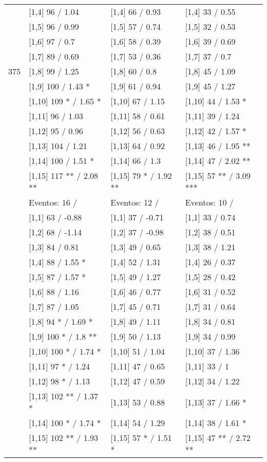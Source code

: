 \begin{table}
\begin{tabular}[t]{llll}
\addlinespace
 & {}[1,4] 96  / 1.04 & {}[1,4] 66  / 0.93 & {}[1,4] 33  / 0.55\\
 & {}[1,5] 96  / 0.99 & {}[1,5] 57  / 0.74 & {}[1,5] 32  / 0.53\\
 & {}[1,6] 97  / 0.7 & {}[1,6] 58  / 0.39 & {}[1,6] 39  / 0.69\\
 & {}[1,7] 89  / 0.69 & {}[1,7] 53  / 0.36 & {}[1,7] 37  / 0.7\\
375 & {}[1,8] 99  / 1.25 & {}[1,8] 60  / 0.8 & {}[1,8] 45  / 1.09\\
\addlinespace
 & {}[1,9] 100  / 1.43 * & {}[1,9] 61  / 0.94 & {}[1,9] 45  / 1.27\\
 & {}[1,10] 109 * / 1.65 * & {}[1,10] 67  / 1.15 & {}[1,10] 44  / 1.53 *\\
 & {}[1,11] 96  / 1.03 & {}[1,11] 58  / 0.61 & {}[1,11] 39  / 1.24\\
 & {}[1,12] 95  / 0.96 & {}[1,12] 56  / 0.63 & {}[1,12] 42  / 1.57 *\\
 & {}[1,13] 104  / 1.21 & {}[1,13] 64  / 0.92 & {}[1,13] 46  / 1.95 **\\
\addlinespace
 & {}[1,14] 100  / 1.51 * & {}[1,14] 66  / 1.3 & {}[1,14] 47  / 2.02 **\\
 & {}[1,15] 117 ** / 2.08 ** & {}[1,15] 79 * / 1.92 ** & {}[1,15] 57 ** / 3.09 ***\\
 & Eventos:  16 / & Eventos:  12 / & Eventos:  10 /\\
 & {}[1,1] 63  / -0.88 & {}[1,1] 37  / -0.71 & {}[1,1] 33  / 0.74\\
 & {}[1,2] 68  / -1.14 & {}[1,2] 37  / -0.98 & {}[1,2] 38  / 0.51\\
\addlinespace
 & {}[1,3] 84  / 0.81 & {}[1,3] 49  / 0.65 & {}[1,3] 38  / 1.21\\
 & {}[1,4] 88  / 1.55 * & {}[1,4] 52  / 1.31 & {}[1,4] 26  / 0.37\\
 & {}[1,5] 87  / 1.57 * & {}[1,5] 49  / 1.27 & {}[1,5] 28  / 0.42\\
 & {}[1,6] 88  / 1.16 & {}[1,6] 46  / 0.77 & {}[1,6] 31  / 0.52\\
 & {}[1,7] 87  / 1.05 & {}[1,7] 45  / 0.71 & {}[1,7] 31  / 0.64\\
\addlinespace
500 & {}[1,8] 94 * / 1.69 * & {}[1,8] 49  / 1.11 & {}[1,8] 34  / 0.81\\
 & {}[1,9] 100 * / 1.8 ** & {}[1,9] 50  / 1.13 & {}[1,9] 34  / 0.99\\
 & {}[1,10] 100 * / 1.74 * & {}[1,10] 51  / 1.04 & {}[1,10] 37  / 1.36\\
 & {}[1,11] 97 * / 1.24 & {}[1,11] 47  / 0.65 & {}[1,11] 33  / 1\\
 & {}[1,12] 98 * / 1.13 & {}[1,12] 47  / 0.59 & {}[1,12] 34  / 1.22\\
\addlinespace
 & {}[1,13] 102 ** / 1.37 * & {}[1,13] 53  / 0.88 & {}[1,13] 37  / 1.66 *\\
 & {}[1,14] 100 * / 1.74 * & {}[1,14] 54  / 1.29 & {}[1,14] 38  / 1.61 *\\
 & {}[1,15] 102 ** / 1.93 ** & {}[1,15] 57 * / 1.51 * & {}[1,15] 47 ** / 2.72 **\\
\bottomrule
\end{tabular}
\end{table}
